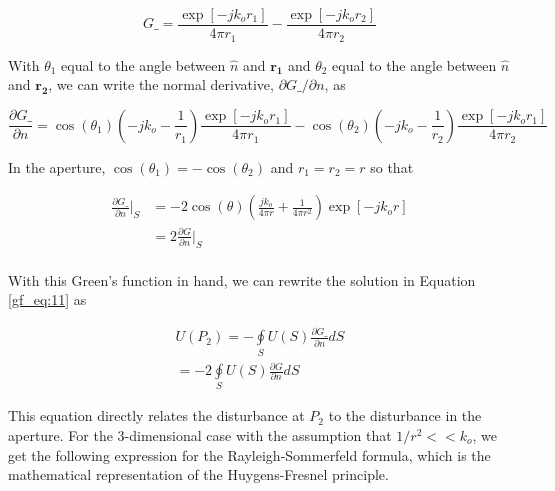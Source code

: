 \begin{equation}
G\_= \frac{\exp[-jk_or_1]}{4\pi r_1} - \frac{\exp[-jk_or_2]}{4\pi r_2}
\label{gf_eq:49}
\end{equation}
\renewcommand{\baselinestretch}{2} \small\normalsize

With $\theta_1$ equal to the angle between $\hat{n}$ and $\mathbf{r_1}$ and $\theta_2$ equal to the angle between $\hat{n}$ and $\mathbf{r_2}$, we can write the normal derivative, $\partial G\_/\partial n$, as 

\begin{equation}
\frac{\partial G\_}{\partial n}
=\cos(\theta_1)\left(-jk_o - \frac{1}{r_1} \right)\frac{\exp[-jk_or_1]}{4\pi r_1} -\cos(\theta_2)\left(-jk_o - \frac{1}{r_2} \right)\frac{\exp[-jk_or_1]}{4\pi r_2}
\label{gf_eq:50}
\end{equation}
\renewcommand{\baselinestretch}{2} \small\normalsize

\noindent In the aperture, $\cos(\theta_1) = -\cos(\theta_2)$ and $r_1=r_2=r$ so that

\begin{equation}
\begin{aligned}
\frac{\partial G\_}{\partial n}\bigg|_S &= -2\cos(\theta)\left(\frac{jk_o}{4\pi r} + \frac{1}{4\pi r^2}\right)\exp[-jk_or]\\
&=2\frac{\partial G}{\partial n}\bigg|_S \\
\end{aligned}
\label{gf_eq:51}
\end{equation}
\renewcommand{\baselinestretch}{2} \small\normalsize

\noindent With this Green's function in hand, we can rewrite the solution in Equation \ref{gf_eq:11} as

\begin{equation}
\begin{gathered}
U(P_2) = -\oint\limits_{S}U(S)\frac{\partial G\_}{\partial n}dS\\
= -2\oint\limits_{S}U(S)\frac{\partial G}{\partial n}dS
\end{gathered}
\label{gf_eq:52}
\end{equation}
\renewcommand{\baselinestretch}{2} \small\normalsize

This equation directly relates the disturbance at $P_2$ to the disturbance in the aperture. For the 3-dimensional case with the assumption that $1/r^2 << k_o$, we get the following expression for the Rayleigh-Sommerfeld formula, which is the mathematical representation of the Huygens-Fresnel principle.

